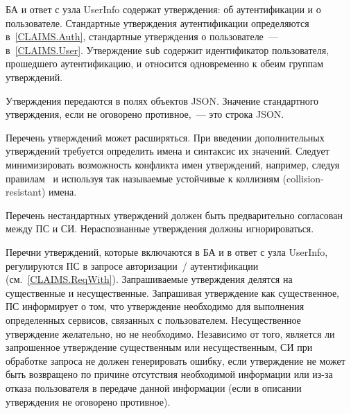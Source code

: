 \label{CLAIMS.General}

БА и ответ с узла UserInfo содержат утверждения: об аутентификации и о 
пользователе. Стандартные утверждения аутентификации определяются в~\ref{CLAIMS.Auth}, 
стандартные утверждения о пользователе~--- в~\ref{CLAIMS.User}. 
%
Утверждение \lstinline{sub} содержит идентификатор пользователя, прошедшего 
аутентификацию, и относится одновременно к обеим группам утверждений.

Утверждения передаются в полях объектов JSON. Значение стандартного 
утверждения, если не оговорено противное,~--- это строка JSON.

Перечень утверждений может расширяться. При введении дополнительных утверждений 
требуется определить имена и синтаксис их значений. 
%
Следует минимизировать возможность конфликта имен утверждений, например, 
следуя правилам~\cite{RFC7519} и используя так называемые 
устойчивые к коллизиям (collision-resistant) имена. 

Перечень нестандартных утверждений должен быть предварительно согласован между
ПС и СИ. Нераспознанные утверждения должны игнорироваться.

Перечни утверждений, которые включаются в БА и в ответ с узла UserInfo, 
регулируются ПС в запросе авторизации~/ аутентификации (см.~\ref{CLAIMS.ReqWith}).
%
Запрашиваемые утверждения делятся на существенные и несущественные.
%
Запрашивая утверждение как существенное, ПС информирует о том, что 
утверждение необходимо для выполнения определенных сервисов, связанных с 
пользователем.
%
Несущественное утверждение желательно, но не необходимо.
%
Независимо от того, является ли запрошенное утверждение существенным или 
несущественным, СИ при обработке запроса не должен генерировать ошибку, если 
утверждение не может быть возвращено по причине отсутствия необходимой 
информации или из-за отказа пользователя в передаче данной информации 
(если в описании утверждения не оговорено противное).

